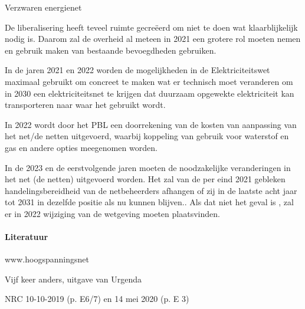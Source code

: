 \begin{voorstel}{Verzwaren energienet}
\begin{overwegingen}
De liberalisering heeft teveel ruimte gecreëerd om niet te doen wat klaarblijkelijk nodig is. Daarom zal de overheid al meteen in 2021 een grotere rol moeten nemen en gebruik maken van bestaande bevoegdheden gebruiken.
\end{overwegingen}

\begin{aanbevelingen}
In de jaren 2021 en 2022 worden de mogelijkheden in de Elektriciteitswet  maximaal gebruikt om concreet te maken wat er technisch moet veranderen om in 2030 een elektriciteitsnet te krijgen dat duurzaam opgewekte elektriciteit kan transporteren naar waar het gebruikt wordt.

In 2022 wordt door het PBL een doorrekening  van de kosten van aanpassing van het net/de netten uitgevoerd, waarbij koppeling van gebruik voor waterstof en gas en andere opties meegenomen worden.

In de 2023 en de eerstvolgende jaren moeten de noodzakelijke veranderingen in het net (de netten) uitgevoerd worden. Het zal van de per eind  2021 gebleken handelingsbereidheid van de netbeheerders afhangen of zij in de laatste acht jaar tot 2031 in dezelfde positie als nu kunnen blijven.. Als dat niet het geval is , zal er in 2022 wijziging van de wetgeving moeten plaatsvinden.
\end{aanbevelingen}

\paragraph{Literatuur}
www.hoogspanningsnet

Vijf keer anders, uitgave van Urgenda

NRC 10-10-2019 (p. E6/7) en 14 mei 2020 (p. E 3)

\end{voorstel}
